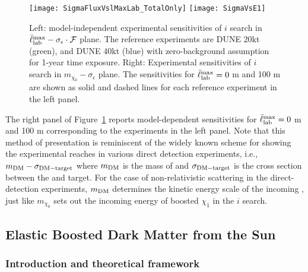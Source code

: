 \begin{figure}[t]
\centering
\texttt{[image: SigmaFluxVslMaxLab\_TotalOnly]}
\texttt{[image: SigmaVsE1]}
\caption[Model-independent experimental sensitivities of $i$BDM search]{
Left: model-independent experimental sensitivities of $i$ search in $\bar{\ell}_{\rm lab}^{\rm max} - \sigma_\epsilon \cdot \mathcal F$ plane. 
The reference experiments are
DUNE 20kt (green), and DUNE 40kt (blue) with zero-background assumption for 1-year time exposure. 
Right: Experimental sensitivities of $i$ search in $m_{\chi_0} - \sigma_\epsilon$ plane. The sensitivities for $\bar{\ell}_{\rm lab}^{\rm max} = 0$ m and 100 m are shown as solid and dashed lines for each reference experiment in the left panel.
\label{fig:modelindependent} }
\end{figure}

The right panel of Figure~\ref{fig:modelindependent} reports model-dependent sensitivities for $\bar{\ell}_{\rm lab}^{\rm max} = 0$ m and 100 m corresponding to the experiments in the left panel.
Note that this %
method of presentation is reminiscent of the widely known scheme for showing the experimental reaches in various  direct detection experiments, i.e., $m_{\rm DM} - \sigma_{\rm DM - target}$ where $m_{\rm DM}$ is the mass of  and $\sigma_{\rm DM - target}$ is the cross section between the  and target. 
For the case of non-relativistic  scattering in the direct-detection experiments, $m_{\rm DM}$ determines the kinetic energy scale of the incoming , just like $m_{\chi_0}$ sets out the incoming energy of boosted $\chi_1$ in the $i$ search. 

\subsection{Elastic Boosted Dark Matter from the Sun \label{sec:FDsun}}

\subsubsection{\label{sec:level2} Introduction and theoretical framework}

